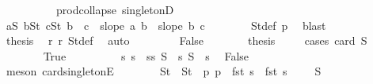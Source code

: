 \begin{isabellebody}
\ \ \ \ \ \ \ \ \ \ prod{\isachardot}{\kern0pt}collapse\ singletonD{\isacharparenright}{\kern0pt}\isanewline
\ \ \ \ \isamarkupfalse%
\ {\isachardoublequoteopen}{\isasymforall}a{\isasymin}S{}{\isachardot}{\kern0pt}\ {\isasymforall}b{\isasymin}S{}t{\isachardot}{\kern0pt}\ {\isasymforall}c{\isasymin}S{}t{\isachardot}{\kern0pt}\ b\ {\isacharless}{\kern0pt}\ c\ {\isasymlongrightarrow}\ slope\ a\ b\ {\isachargreater}{\kern0pt}\ slope\ b\ c{\isachardoublequoteclose}\isanewline
\ \ \ \ \ \ \isamarkupfalse%
\ S{}t{\isacharunderscore}{\kern0pt}def\ p{}\ \isamarkupfalse%
\ blast\isanewline
\ \ \ \ \isamarkupfalse%
\ \isamarkupfalse%
\ {\isacharquery}{\kern0pt}thesis\ \isamarkupfalse%
\ r{}\ r{}\ S{}t{\isacharunderscore}{\kern0pt}def\ \isamarkupfalse%
\ auto\isanewline
\ \ \isamarkupfalse%
\isanewline
\ \ \ \ \isamarkupfalse%
\ False\isanewline
\ \ \ \ \isamarkupfalse%
\ \isamarkupfalse%
\ {\isacharquery}{\kern0pt}thesis\isanewline
\ \ \ \ \isamarkupfalse%
{\isacharparenleft}{\kern0pt}cases\ {\isachardoublequoteopen}card\ S{}\ {\isacharequal}{\kern0pt}\ {}{\isachardoublequoteclose}{\isacharparenright}{\kern0pt}\ \isanewline
\ \ \ \ \ \ \isamarkupfalse%
\ True\isanewline
\ \ \ \ \ \ \isamarkupfalse%
\ \isamarkupfalse%
\ s{}\ s{}\ \ s{}s{}{\isacharcolon}{\kern0pt}\ {\isachardoublequoteopen}S{}\ {\isacharequal}{\kern0pt}\ {\isacharbraceleft}{\kern0pt}s{}{\isacharbraceright}{\kern0pt}{\isachardoublequoteclose}\ {\isachardoublequoteopen}S{}\ {\isacharequal}{\kern0pt}\ {\isacharbraceleft}{\kern0pt}s{}{\isacharbraceright}{\kern0pt}{\isachardoublequoteclose}\ \isamarkupfalse%
\ False\isanewline
\ \ \ \ \ \ \ \ \isamarkupfalse%
\ {\isacharparenleft}{\kern0pt}meson\ card{\isacharunderscore}{\kern0pt}{}{\isacharunderscore}{\kern0pt}singletonE{\isacharparenright}{\kern0pt}\isanewline
\ \ \ \ \ \ \isamarkupfalse%
\ S{}t\ \ {\isachardoublequoteopen}S{}t\ {\isacharequal}{\kern0pt}\ {\isacharparenleft}{\kern0pt}{\isasymlambda}p{\isachardot}{\kern0pt}\ p\ {\isacharplus}{\kern0pt}\ {\isacharparenleft}{\kern0pt}{\isacharminus}{\kern0pt}fst\ s{}\ {\isacharplus}{\kern0pt}\ fst\ s{}\ {\isacharplus}{\kern0pt}\ {}{\isacharcomma}{\kern0pt}\ {}{\isacharparenright}{\kern0pt}{\isacharparenright}{\kern0pt}\ {\isacharbackquote}{\kern0pt}\ S{}{\isachardoublequoteclose}\isanewline

\end{isabellebody}
